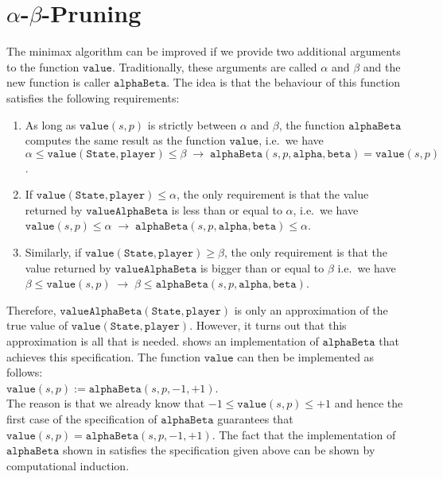 \section{$\alpha$-$\beta$-Pruning}
The minimax algorithm can be improved if we provide two additional arguments to the function $\mathtt{value}$.
Traditionally, these arguments are called 
$\alpha$ and $\beta$ and the new function is caller $\mathtt{alphaBeta}$.  The idea is that the behaviour of
this function satisfies the following requirements:
\begin{enumerate}
\item As long as $\mathtt{value}(s, p)$ is strictly between $\alpha$ and $\beta$, the function
      $\mathtt{alphaBeta}$ computes the same result as the function $\mathtt{value}$,
      i.e.~we have
      \\[0.2cm]
      \hspace*{0.3cm}
      $\alpha \leq \mathtt{value}(\mathtt{State}, \mathtt{player}) \leq \beta \;\rightarrow\;
         \mathtt{alphaBeta}(s, p, \mathtt{alpha}, \mathtt{beta}) = \mathtt{value}(s,p)
      $.
\item If $\mathtt{value}(\mathtt{State},\mathtt{player}) \leq \alpha$, the only requirement is that
      the value returned by $\mathtt{valueAlphaBeta}$ is less than or equal to $\alpha$,
      i.e.~we have 
      \\[0.2cm]
      \hspace*{0.3cm}
      $\mathtt{value}(s, p) \leq \alpha \;\rightarrow\;
       \mathtt{alphaBeta}(s, p, \mathtt{alpha}, \mathtt{beta}) \leq \alpha
      $.
\item Similarly, if $\mathtt{value}(\mathtt{State},\mathtt{player}) \geq \beta$, the only requirement is that
      the value returned by $\mathtt{valueAlphaBeta}$ is bigger than or equal to $\beta$
      i.e.~we have 
      \\[0.2cm]
      \hspace*{0.3cm}
      $\beta \leq \mathtt{value}(s, p) \;\rightarrow\;
        \beta \leq \mathtt{alphaBeta}(s, p, \mathtt{alpha}, \mathtt{beta}) 
      $.
\end{enumerate}
Therefore, $\mathtt{valueAlphaBeta}(\mathtt{State}, \mathtt{player})$  is only an approximation of the true
value of $\mathtt{value}(\mathtt{State}, \mathtt{player})$.  However, it turns out that this approximation is all that is
needed.   shows an implementation of $\mathtt{alphaBeta}$ that achieves this
specification.  The function $\mathtt{value}$ can then be implemented as follows:
\\[0.2cm]
\hspace*{1.3cm}
$\mathtt{value}(s, p ) := \mathtt{alphaBeta}(s, p, -1, +1)$.
\\[0.2cm]
The reason is that we already know that $-1 \leq \mathtt{value}(s,p) \leq +1$ and hence the first case of the
specification of $\mathtt{alphaBeta}$ guarantees that $\mathtt{value}(s,p) = \mathtt{alphaBeta}(s,p,-1,+1)$.
The fact that the implementation of $\mathtt{alphaBeta}$ shown in  satisfies the
specification given above can be shown by computational induction.  


